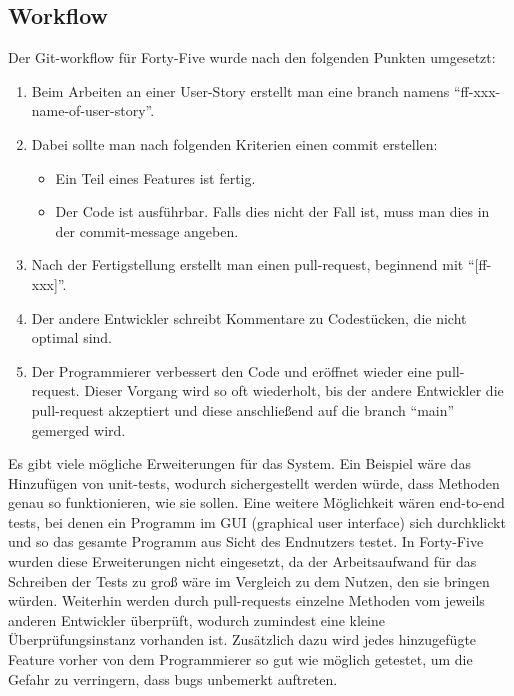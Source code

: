 \renewcommand{\kapitelautor}{Autor: Felix Zwickelstorfer}
\subsection{Workflow}\label{subsec:workflow}

Der Git-workflow für Forty-Five wurde nach den folgenden Punkten umgesetzt:
\begin{enumerate}
    \item Beim Arbeiten an einer User-Story erstellt man eine branch namens ``ff-xxx-name-of-user-story''.
    \item Dabei sollte man nach folgenden Kriterien einen commit erstellen:
    \begin{itemize}
        \item Ein Teil eines Features ist fertig.
        \item Der Code ist ausführbar.
        Falls dies nicht der Fall ist, muss man dies in der commit-message angeben.
    \end{itemize}
    \item Nach der Fertigstellung erstellt man einen pull-request, beginnend mit ``[ff-xxx]''.
    \item Der andere Entwickler schreibt Kommentare zu Codestücken, die nicht optimal sind.
    \item Der Programmierer verbessert den Code und eröffnet wieder eine pull-request.
    Dieser Vorgang wird so oft wiederholt, bis der andere Entwickler die pull-request akzeptiert und diese anschließend auf die branch ``main'' gemerged wird.
\end{enumerate}

Es gibt viele mögliche Erweiterungen für das System.
Ein Beispiel wäre das Hinzufügen von unit-tests, wodurch sichergestellt werden würde, dass Methoden genau so funktionieren, wie sie sollen.
Eine weitere Möglichkeit wären end-to-end tests, bei denen ein Programm im GUI (graphical user interface) sich durchklickt und so das gesamte Programm aus Sicht des Endnutzers testet.
In Forty-Five wurden diese Erweiterungen nicht eingesetzt, da der Arbeitsaufwand für das Schreiben der Tests zu groß wäre im Vergleich zu dem Nutzen, den sie bringen würden.
Weiterhin werden durch pull-requests einzelne Methoden vom jeweils anderen Entwickler überprüft, wodurch zumindest eine kleine Überprüfungsinstanz vorhanden ist.
Zusätzlich dazu wird jedes hinzugefügte Feature vorher von dem Programmierer so gut wie möglich getestet, um die Gefahr zu verringern, dass bugs unbemerkt auftreten.
